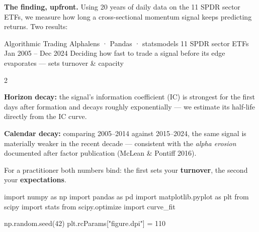 \documentclass{pyportfolios-note}
\begin{document}
\thispagestyle{notecover}




\textbf{The finding, upfront.} Using 20 years of daily data on the 11 SPDR
sector ETFs, we measure how long a cross-sectional momentum signal keeps
predicting returns. Two results:

\notecard
  {Algorithmic Trading}
  {Alphalens · Pandas · statsmodels}
  {11 SPDR sector ETFs}
  {Jan 2005 – Dec 2024}
  {Deciding how fast to trade a signal before its edge evaporates — sets
   turnover \& capacity}

\begin{multicols}{2}
\begin{notebulletsnum}
\item \textbf{Horizon decay:} the signal's information coefficient (IC) is
      strongest for the first days after formation and decays roughly
      exponentially — we estimate its half-life directly from the IC curve.
\item \textbf{Calendar decay:} comparing 2005–2014 against 2015–2024, the same
      signal is materially weaker in the recent decade — consistent with the
      \textit{alpha erosion} documented after factor publication (McLean \&
      Pontiff 2016).
\end{notebulletsnum}

For a practitioner both numbers bind: the first sets your \textbf{turnover},
the second your \textbf{expectations}.
\end{multicols}

\begin{notecode}
import numpy as np
import pandas as pd
import matplotlib.pyplot as plt
from scipy import stats
from scipy.optimize import curve_fit

np.random.seed(42)
plt.rcParams["figure.dpi"] = 110
\end{notecode}

\noteneedroom{150bp}
\end{document}

